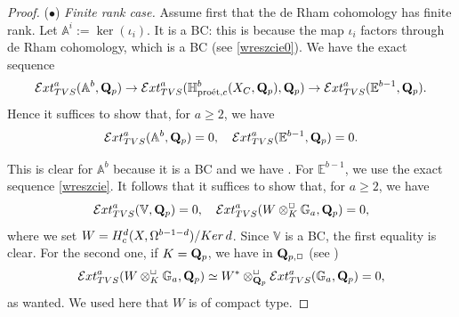 \documentclass[10pt,reqno]{amsart}
\theoremstyle{definition}
\theoremstyle{remark}
\newcommand{\proeet}{\operatorname{pro\acute{e}t} }
\newcommand{\im}{\operatorname{Im} }
\numberwithin{equation}{section}
\def\Q{{\bf Q}} \def\Z{{\bf Z}}
\numberwithin{equation}{section}
\begin{document}
\begin{proof}
  
  
\vskip2mm
($\bullet$) {\em Finite rank case.}  Assume first that the de Rham  cohomology has finite rank. 
  Let $
  {\mathbb A}^i:=\ker(\iota_i). %
  $ 
It is a   BC: this is because the map $\iota_i$ factors through de Rham cohomology, which is a  BC (see \eqref{wreszcie0}). 
  We have the exact sequence
  \begin{equation}\label{presentation2}
  {\mathcal Ext}^a_{\rm TVS}({\mathbb A}^b,\Q_p)\to {\mathcal Ext}^a_{\rm TVS}({\mathbb H}^{b}_{\proeet,c}(X_C,\Q_p),\Q_p)\to {\mathcal Ext}^a_{\rm TVS}({\mathbb E}^{b-1},\Q_p).
  \end{equation}
 Hence  it suffices to show that, for $a\geq 2$, we have 
 \begin{equation}\label{presentation3}
    {\mathcal Ext}^a_{\rm TVS}({\mathbb A}^b,\Q_p)=0, \quad   {\mathcal Ext}^a_{\rm TVS}({\mathbb E}^{b-1},\Q_p)=0. 
\end{equation}
  
    This is clear for ${\mathbb A}^b$ because it  is a BC and we have \cite[Ex. 4.29]{TVS}.  For ${\mathbb E}^{b-1}$,  we use the exact sequence \eqref{wreszcie}. It follows that
    it suffices  to show that, for $a\geq 2$, we have 
    $$
     {\mathcal Ext}^a_{\rm TVS}(\mathbb{V},\Q_p)=0,\quad  {\mathcal Ext}^a_{\rm TVS}(W\otimes^{\Box}_{K}\mathbb{G}_a,\Q_p)=0,
    $$
    where we set $W=H^d_c(X,\Omega^{b-1-d})/{\rm Ker}\,d$. 
    Since $\mathbb{V}$ is a BC, the first equality is clear. 
     For the second one,  if $K=\Q_p$, we have in $\Q_{p,\Box}$ (see \cite[Lemma 3.27]{TVS})
    $$
     {\mathcal Ext}^a_{\rm TVS}(W\otimes^{\Box}_{K}\mathbb{G}_a,\Q_p)\simeq W^*\otimes^{\Box}_{\Q_{p} }    {\mathcal Ext}^a_{\rm TVS}(\mathbb{G}_a,\Q_p)=0,
    $$
    as wanted.  We used here that $W$ is of compact type.  


\end{proof}
\end{document}

